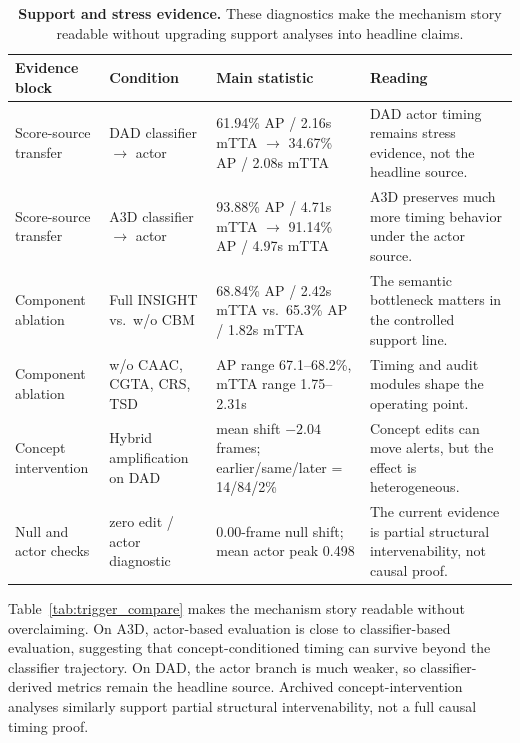 \documentclass[11pt]{article}
\newcommand{\method}{\textsc{INSIGHT}}
\newcommand{\cbm}{\textsc{CBM}}
\newcommand{\caac}{\textsc{CAAC}}
\newcommand{\cgta}{\textsc{CGTA}}
\newcommand{\crs}{\textsc{CRS}}
\newcommand{\tsd}{\textsc{TSD}}
\begin{document}
\begin{table}[t]
\centering\scriptsize
\setlength{\tabcolsep}{4pt}
\caption{\textbf{Support and stress evidence.} These diagnostics make the
mechanism story readable without upgrading support analyses into headline
claims.}
\label{tab:trigger_compare}
\label{tab:ablation}
\label{tab:interp_quant}
\begin{tabular}{p{}p{}p{}p{}}
\toprule
Evidence block & Condition & Main statistic & Reading \\
\midrule
Score-source transfer & DAD classifier $\rightarrow$ actor &
61.94\% AP / 2.16s mTTA $\rightarrow$ 34.67\% AP / 2.08s mTTA &
DAD actor timing remains stress evidence, not the headline source. \\
Score-source transfer & A3D classifier $\rightarrow$ actor &
93.88\% AP / 4.71s mTTA $\rightarrow$ 91.14\% AP / 4.97s mTTA &
A3D preserves much more timing behavior under the actor source. \\
Component ablation & Full \method{} vs.\ w/o \cbm{} &
68.84\% AP / 2.42s mTTA vs.\ 65.3\% AP / 1.82s mTTA &
The semantic bottleneck matters in the controlled support line. \\
Component ablation & w/o \caac{}, \cgta{}, \crs{}, \tsd{} &
AP range 67.1--68.2\%, mTTA range 1.75--2.31s &
Timing and audit modules shape the operating point. \\
Concept intervention & Hybrid amplification on DAD &
mean shift $-2.04$ frames; earlier/same/later = 14/84/2\% &
Concept edits can move alerts, but the effect is heterogeneous. \\
Null and actor checks & zero edit / actor diagnostic &
0.00-frame null shift; mean actor peak 0.498 &
The current evidence is partial structural intervenability, not causal proof. \\
\bottomrule
\end{tabular}
\end{table}

Table~\ref{tab:trigger_compare} makes the mechanism
story readable without overclaiming. On A3D, actor-based evaluation is close to
classifier-based evaluation, suggesting that concept-conditioned timing can
survive beyond the classifier trajectory. On DAD, the actor branch is much
weaker, so classifier-derived metrics remain the headline source. Archived
concept-intervention analyses similarly support partial structural
intervenability, not a full causal timing proof.
\end{document}
